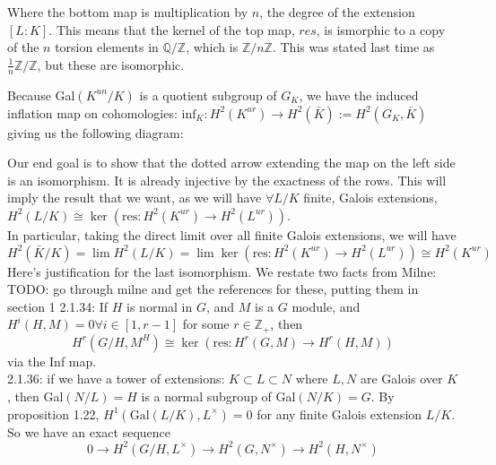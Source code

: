 \documentclass[class=article, crop=false]{standalone}
\begin{document}
\begin{center}
\end{center}

Where the bottom map is multiplication by $n$, 
the degree of the extension $[L:K]$. 
This means that the kernel of the top map, 
$res$, is ismorphic to a copy of the $n$ torsion elements in 
$\mathbb{Q}/\mathbb{Z}$, which is $\mathbb{Z}/n\mathbb{Z}$. 
This was stated last time as 
$\frac{1}{n}\mathbb{Z}/\mathbb{Z}$, but these are isomorphic. 

Because Gal$(K^{un}/K)$ is a quotient subgroup of $G_K$, we have the induced inflation map on cohomologies: $\text{inf}_K:H^2(K^{ur})\rightarrow H^2(\bar{K}):=H^2(G_K,\bar{K})$ giving us the following diagram: 

\begin{center}
\end{center}


Our end goal is to show that the dotted arrow extending 
the map on the left side is an isomorphism. 
It is already injective by the exactness of the
rows.
This will imply the result that we want, as we will have 
$\forall L/K$ finite, Galois extensions, $H^2(L/K)\cong \ker(\text{res}: H^2(K^{ur})\rightarrow H^2(L^{ur}))$.\\

In particular, taking the direct limit over all finite Galois extensions, 
we will have 
$$H^2(\bar{K}/K)=\lim H^2(L/K)=\lim 
\ker(\text{res}: H^2(K^{ur})\rightarrow H^2(L^{ur})) \cong H^2(K^{ur})$$ 
Here's justification for the last isomorphism. 
We restate two facts from Milne: \\

{\color{red} TODO: go through milne and get the 
references for these, putting them in section 1}
2.1.34: If $H$ is normal in $G$, and $M$ is a $G$ module, and $H^i(H, M)=0 \forall i\in [1, r-1]$ for some $r\in\mathbb{Z}_+$, then
$$H^r(G/H, M^H)\cong \ker(\text{res}:H^r(G,M)\rightarrow H^r(H,M))$$ via the Inf map. \\
2.1.36: if we have a tower of extensions: $K\subset L\subset N$ where $L, N$ are Galois over $K$, then Gal$(N/L)=H$ is a normal subgroup of Gal$(N/K)=G$. By proposition 1.22, $H^1(\text{Gal}(L/K), L^\times)=0$ for any finite Galois extension $L/K$. So we have an exact sequence
$$0\rightarrow H^2(G/H, L^\times)\rightarrow H^2(G, N^\times)\rightarrow H^2(H, N^\times)$$
\end{document}

